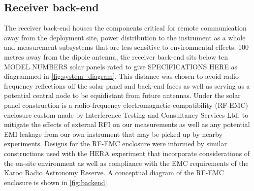 \subsection{Receiver back-end}
The receiver back-end houses the components critical for remote communication away from the deployment site, power distribution to the instrument as a whole and measurement subsystems that are less sensitive to environmental effects. 100 metres away from the dipole antenna, the receiver back-end sits below ten MODEL NUMBERS solar panels rated to give SPECIFICATIONS HERE as diagrammed in \cref{fig:system_diagram}. This distance was chosen to avoid radio-frequency reflections off the solar panel and back-end faces as well as serving as a potential central node to be equidistant from future antennas. Under the solar panel construction is a radio-frequency electromagnetic-compatibility (RF-EMC) enclosure custom made by Interference Testing and Consultancy Services Ltd. to mitigate the effects of external RFI on our measurements as well as any potential EMI leakage from our own instrument that may be picked up by nearby experiments. Designs for the RF-EMC enclosure were informed by similar constructions used with the HERA experiment that incorporate considerations of the on-site environment as well as compliance with the EMC requirements of the Karoo Radio Astronomy Reserve. A conceptual diagram of the RF-EMC enclosure is shown in \cref{fig:backend}.
